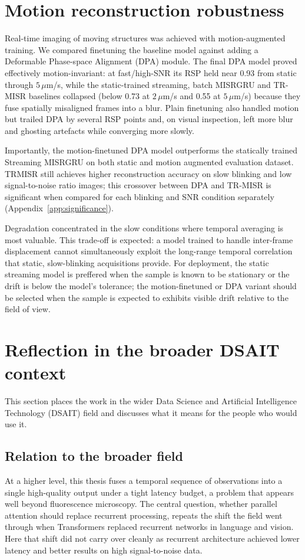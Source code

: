 \section{Motion reconstruction robustness}                                                  
Real-time imaging of moving structures was achieved with
motion-augmented training.
We compared finetuning the baseline model against adding a
Deformable Phase-space Alignment (DPA) module.
The final DPA model proved effectively motion-invariant: at fast/high-SNR its RSP held near
0.93 from static through $5\,\mu$m/s, while the static-trained streaming, batch MISRGRU and
TR-MISR baselines collapsed (below 0.73 at $2\,\mu$m/s and 0.55 at $5\,\mu$m/s) because they
fuse spatially misaligned frames into a blur. Plain finetuning also handled motion but
trailed DPA by several RSP points and, on visual inspection, left more blur and ghosting
artefacts while converging more slowly.

Importantly, the motion-finetuned DPA model outperforms the statically trained Streaming MISRGRU
 on both static and motion augmented evaluation dataset. TRMISR still achieves higher reconstruction accuracy
 on slow blinking and low signal-to-noise ratio images; this
 crossover between DPA and TR-MISR is significant when compared for each blinking and SNR condition separately
 (Appendix~\ref{app:significance}).

Degradation concentrated in the slow conditions where temporal averaging is most valuable.
This trade-off is expected: a model trained to handle inter-frame displacement     
cannot simultaneously exploit the long-range temporal correlation that static,    
slow-blinking acquisitions provide.                                                    
For deployment, the static streaming model is preffered when the sample is
known to be stationary or the drift is below the model's tolerance; the                
motion-finetuned or DPA variant should be selected when the sample is expected to exhibits visible  
drift relative to the field of view.

\section{Reflection in the broader DSAIT context}

This section places the work in the wider Data Science and Artificial Intelligence
Technology (DSAIT) field and discusses what it means for the people who would use it.

\subsection{Relation to the broader field}
At a higher level, this thesis fuses a temporal sequence of observations into a single
high-quality output under a tight latency budget, a problem that appears well beyond
fluorescence microscopy. The central question, whether parallel attention should replace
recurrent processing, repeats the shift the field went through when Transformers replaced
recurrent networks in language and vision. Here that shift did not carry over cleanly as recurrent
architecture achieved lower latency and better results on high signal-to-noise data.

